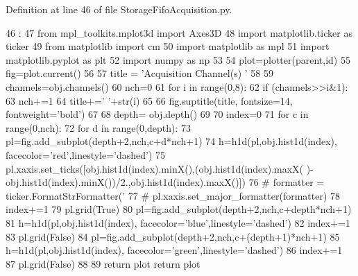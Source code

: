 Definition at line 46 of file StorageFifoAcquisition.py.


\begin{DoxyCode}
46                               :
47     from mpl_toolkits.mplot3d import Axes3D
48     import matplotlib.ticker as ticker
49     from matplotlib import cm
50     import matplotlib as mpl
51     import matplotlib.pyplot as plt
52     import numpy as np
53 
54     plot=plotter(parent,id)
55     fig=plot.current()
56 
57     title = 'Acquisition Channel(s) '
58 
59     channels=obj.channels()
60     nch=0
61     for i in range(0,8): 
62         if (channels>>i&1): 
63             nch+=1
64             title+=' '+str(i)
65 
66     fig.suptitle(title, fontsize=14, fontweight='bold')
67 
68     depth= obj.depth() 
69 
70     index=0
71     for c in range(0,nch):
72         for d in range(0,depth):
73             pl=fig.add_subplot(depth+2,nch,c+d*nch+1)   
74             h=h1d(pl,obj.hist1d(index), facecolor='red',linestyle='dashed')
75             pl.xaxis.set_ticks([obj.hist1d(index).minX(),(obj.hist1d(index).maxX(
      )-obj.hist1d(index).minX())/2.,obj.hist1d(index).maxX()])
76 #           formatter = ticker.FormatStrFormatter('%
77 #           pl.xaxis.set_major_formatter(formatter)
78             index+=1
79             pl.grid(True)
80         pl=fig.add_subplot(depth+2,nch,c+depth*nch+1)   
81         h=h1d(pl,obj.hist1d(index), facecolor='blue',linestyle='dashed')
82         index+=1
83         pl.grid(False)
84         pl=fig.add_subplot(depth+2,nch,c+(depth+1)*nch+1)   
85         h=h1d(pl,obj.hist1d(index), facecolor='green',linestyle='dashed')
86         index+=1
87         pl.grid(False)
88 
89     return plot
    return plot
\end{DoxyCode}
